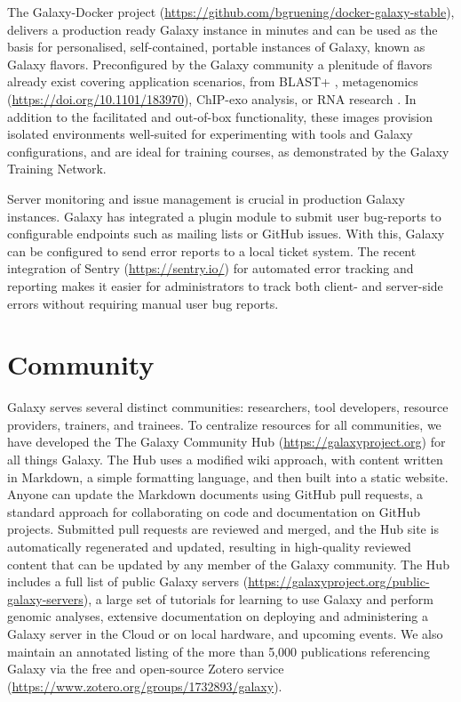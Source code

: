 The Galaxy-Docker project (\url{https://github.com/bgruening/docker-galaxy-stable}), delivers a production ready Galaxy instance in minutes and can be used as the basis for personalised, self-contained, portable instances of Galaxy, known as Galaxy flavors. Preconfigured by the Galaxy community a plenitude of flavors already exist covering application scenarios, from BLAST+ \cite{cock2015ncbi,camacho2009blast+}, metagenomics (\url{https://doi.org/10.1101/183970}), ChIP-exo analysis, or RNA research \cite{gruning2017rna}. In addition to the facilitated and out-of-box functionality, these images provision isolated environments well-suited for experimenting with tools and Galaxy configurations, and are ideal for training courses, as demonstrated by the Galaxy Training Network.

Server monitoring and issue management is crucial in production Galaxy instances. Galaxy has integrated a plugin module to submit user bug-reports to configurable endpoints such as mailing lists or GitHub issues. With this, Galaxy can be configured to send error reports to a local ticket system. The recent integration of Sentry (\url{https://sentry.io/}) for automated error tracking and reporting makes it easier for administrators to track both client- and server-side errors without requiring manual user bug reports.

\section*{Community}
Galaxy serves several distinct communities: researchers, tool developers, resource providers, trainers, and trainees. To centralize resources for all communities, we have developed the The Galaxy Community Hub (\url{https://galaxyproject.org}) for all things Galaxy. The Hub uses a modified wiki approach, with content written in Markdown, a simple formatting language, and then built into a static website. Anyone can update the Markdown documents using GitHub pull requests, a standard approach for collaborating on code and documentation on GitHub projects. Submitted pull requests are reviewed and merged, and the Hub site is automatically regenerated and updated, resulting in high-quality reviewed content that can be updated by any member of the Galaxy community. The Hub includes a full list of public Galaxy servers (\url{https://galaxyproject.org/public-galaxy-servers}), a large set of tutorials for learning to use Galaxy and perform genomic analyses, extensive documentation on deploying and administering a Galaxy server in the Cloud or on local hardware, and upcoming events. We also maintain an annotated listing of the more than 5,000 publications referencing Galaxy via the free and open-source Zotero service (\url{https://www.zotero.org/groups/1732893/galaxy}).

